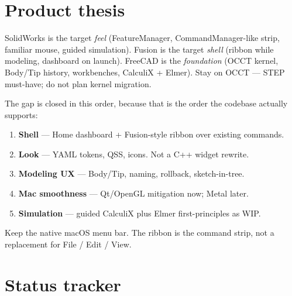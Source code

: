 \documentclass[11pt]{article}
\begin{document}
\section{Product thesis}

SolidWorks is the target \emph{feel} (FeatureManager, CommandManager-like strip,
familiar mouse, guided simulation). Fusion is the target \emph{shell} (ribbon
while modeling, dashboard on launch). FreeCAD is the \emph{foundation} (OCCT
kernel, Body/Tip history, workbenches, CalculiX + Elmer). Stay on OCCT --- STEP
must-have; do not plan kernel migration.

The gap is closed in this order, because that is the order the codebase actually
supports:

\begin{enumerate}[label=\textbf{\arabic*.}]
  \item \textbf{Shell} --- Home dashboard + Fusion-style ribbon over existing commands.
  \item \textbf{Look} --- YAML tokens, QSS, icons. Not a C++ widget rewrite.
  \item \textbf{Modeling UX} --- Body/Tip, naming, rollback, sketch-in-tree.
  \item \textbf{Mac smoothness} --- Qt/OpenGL mitigation now; Metal later.
  \item \textbf{Simulation} --- guided CalculiX plus Elmer first-principles as WIP.
\end{enumerate}

Keep the native macOS menu bar. The ribbon is the command strip, not a replacement
for File / Edit / View.

\section{Status tracker}
\end{document}
